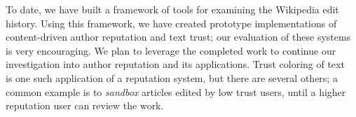 To date, we have built a framework of tools for examining
the Wikipedia edit history.
Using this framework, we have created prototype implementations
of content-driven author reputation and text trust;
our evaluation of these systems is very encouraging.
We plan to leverage the completed work to continue
our investigation into author reputation and its applications.
Trust coloring of text~\cite{WikiMTWtrust06,Cr06,McGuinness06,WikiTrust2008}
is one such application of a reputation system,
but there are several others; a common example is to
\textit{sandbox} articles edited by low trust users,
until a higher reputation user can review the work.

